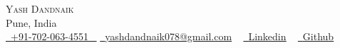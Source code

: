 \documentclass[letterpaper,11pt]{article}
\makeatletter
\newcommand{\resumeSubheading}[4]{
    \vspace{-2pt}\item
      \begin{tabular*}{1.0\textwidth}[t]{l@{\extracolsep{\fill}}r}
        \textbf{\large#1} & \textbf{\small #2} \\
        \textit{\large#3} & \textit{\small #4} \\
        
      \end{tabular*}\vspace{-7pt}
  }
\newcommand{\resumeSubHeadingListStart}{\begin{itemize}[leftmargin=0.0in, label={}]}
\newcommand{\resumeSubHeadingListEnd}{\end{itemize}}
\makeatother
\begin{document}


  \begin{center}
      {\Huge \scshape                                    Yash Dandnaik} \\ \vspace{1pt}
      Pune, India \\ \vspace{1pt}
      \small \href{tel:#}{ \raisebox{-0.1\height}\faPhone\ \underline{+91-702-063-4551} ~} \href{mailto:yashdandnaik078@gmail.com}{\raisebox{-0.2\height}\faEnvelope\  \underline{yashdandnaik078@gmail.com}} ~ 
      \href{https://linkedin.com/in/yash-dandnaik}{\raisebox{-0.2\height}\faLinkedinSquare\ \underline{Linkedin}}  ~
      \href{https://github.com/yash-ad}{\raisebox{-0.2\height}\faGithub\ \underline{Github}} ~
  \end{center}
  \vspace{0.5mm}


    

\end{document}
